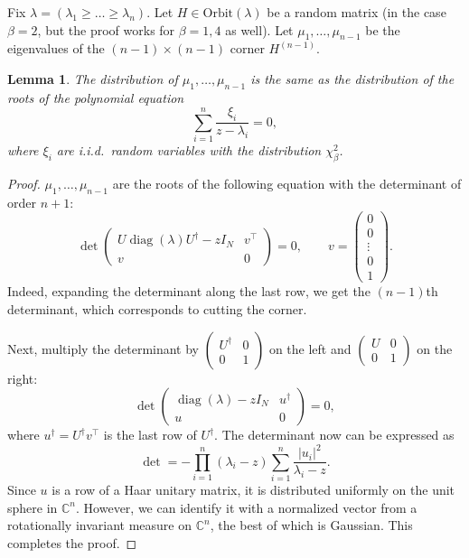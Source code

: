 \documentclass[letterpaper,11pt,oneside,reqno]{article}
\numberwithin{equation}{section}
\newtheorem{lemma}[proposition]{Lemma}
\theoremstyle{definition}
\begin{document}
Fix $\lambda=(\lambda_1\ge \ldots \ge \lambda_n )$.
Let $H\in \mathrm{Orbit}(\lambda)$ be a random matrix
(in the case $\beta=2$, but the proof works for $\beta=1,4$ as well).
Let $\mu_1,\ldots,\mu_{n-1}$ be the eigenvalues of the $(n-1)\times(n-1)$ corner $H^{(n-1)}$.
\begin{lemma}
	\label{lemma:corner_step}
	The distribution of $\mu_1,\ldots,\mu_{n-1}$ is the same as the distribution of
	the roots of the polynomial equation
	\begin{equation}
		\label{eq:polynomial_equation}
		\sum_{i=1}^n \frac{\xi_i}{z-\lambda_i}=0,
	\end{equation}
	where $\xi_i$ are i.i.d.\ random variables with the distribution $\chi^2_\beta$.
\end{lemma}
\begin{proof}
	$\mu_1,\ldots,\mu_{n-1} $ are the roots of the following
	equation with the determinant of
	order $n+1$:
	\begin{equation*}
		\det\begin{pmatrix}
			U\operatorname{\mathrm{diag}}(\lambda)U^\dagger-z I_N & v^\top\\
			v & 0
		\end{pmatrix}=0,
		\qquad
		v=\begin{pmatrix}
			0\\0\\\vdots\\0\\1
		\end{pmatrix}.
	\end{equation*}
	Indeed, expanding the determinant along the last row, we get the $(n-1)$th
	determinant, which corresponds to cutting the corner.

	Next, multiply the determinant by $\begin{pmatrix} U^\dagger&0\\0&1 \end{pmatrix}$
	on the left
	and $\begin{pmatrix} U & 0\\0&1 \end{pmatrix}$ on the right:
	\begin{equation*}
		\det\begin{pmatrix}
			\operatorname{\mathrm{diag}}(\lambda)-z I_N & u^\dagger\\
			u & 0
		\end{pmatrix}=0,
	\end{equation*}
	where $u^\dagger=U^\dagger v^\top$ is the last row of $U^\dagger$.
	The determinant now can be expressed as
	\begin{equation*}
		\det=-\prod_{i=1}^n(\lambda_i-z)\sum_{i=1}^{n}\frac{|u_i|^2}{\lambda_i-z}.
	\end{equation*}
	Since $u$ is a row of a Haar unitary matrix,
	it is distributed uniformly on the unit sphere in $\mathbb{C}^n$.
	However, we can identify it with a normalized vector from a
	rotationally invariant measure on $\mathbb{C}^n$,
	the best of which is Gaussian.
	This completes the proof.
\end{proof}
\end{document}
